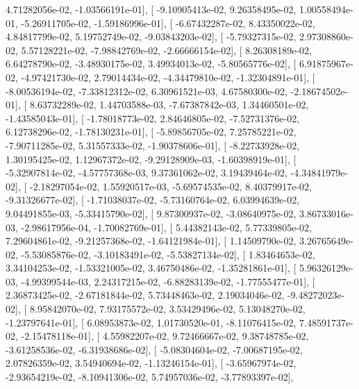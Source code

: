 \documentclass{article}
\begin{document}
          4.71282056e-02,  -1.03566191e-01],
       [ -9.10905413e-02,   9.26358495e-02,   1.00558494e-01,
         -5.26911705e-02,  -1.59186996e-01],
       [ -6.67432287e-02,   8.43350022e-02,   4.84817799e-02,
          5.19752749e-02,  -9.03843203e-02],
       [ -5.79327315e-02,   2.97308860e-02,   5.57128221e-02,
         -7.98842769e-02,  -2.66666154e-02],
       [  8.26308189e-02,   6.64278790e-02,  -3.48930175e-02,
          3.49934013e-02,  -5.80565776e-02],
       [  6.91875967e-02,  -4.97421730e-02,   2.79014434e-02,
         -4.34479810e-02,  -1.32304891e-01],
       [ -8.00536194e-02,  -7.33812312e-02,   6.30961521e-03,
          4.67580300e-02,  -2.18674502e-01],
       [  8.63732289e-02,   1.44703588e-03,  -7.67387842e-03,
          1.34460501e-02,  -1.43585043e-01],
       [ -1.78018773e-02,   2.84646805e-02,  -7.52731376e-02,
          6.12738296e-02,  -1.78130231e-01],
       [ -5.89856705e-02,   7.25785221e-02,  -7.90711285e-02,
          5.31557333e-02,  -1.90378606e-01],
       [ -8.22733928e-02,   1.30195425e-02,   1.12967372e-02,
         -9.29128909e-03,  -1.60398919e-01],
       [ -5.32907814e-02,  -4.57757368e-03,   9.37361062e-02,
          3.19439464e-02,  -4.34841979e-02],
       [ -2.18297054e-02,   1.55920517e-03,  -5.69574535e-02,
          8.40379917e-02,  -9.31326677e-02],
       [ -1.71038037e-02,  -5.73160764e-02,   6.03994639e-02,
          9.04491855e-03,  -5.33415790e-02],
       [  9.87300937e-02,  -3.08640975e-02,   3.86733016e-03,
         -2.98617956e-04,  -1.70082769e-01],
       [  5.44382143e-02,   5.77339805e-02,   7.29604861e-02,
         -9.21257368e-02,  -1.64121984e-01],
       [  1.14509790e-02,   3.26765649e-02,  -5.53085876e-02,
         -3.10183491e-02,  -5.53827134e-02],
       [  1.83464653e-02,   3.34104253e-02,  -1.53321005e-02,
          3.46750486e-02,  -1.35281861e-01],
       [  5.96326129e-03,  -4.99399544e-03,   2.24317215e-02,
         -6.88283139e-02,  -1.77555477e-01],
       [  2.36873425e-02,  -2.67181844e-02,   5.73448463e-02,
          2.19034046e-02,  -9.48272023e-02],
       [  8.95842070e-02,   7.93175572e-02,   3.53429496e-02,
          5.13048270e-02,  -1.23797641e-01],
       [  6.08953873e-02,   1.01730520e-01,  -8.11076415e-02,
          7.48591737e-02,  -2.15478118e-01],
       [  4.55982207e-02,   9.72466667e-02,   9.38748785e-02,
         -3.61258536e-02,  -6.31938686e-02],
       [ -5.08304604e-02,  -7.00687195e-02,   2.07826359e-02,
          3.54940694e-02,  -1.13246154e-01],
       [ -3.65967974e-02,  -2.93654219e-02,  -8.10941306e-02,
          5.74957036e-02,  -3.77893397e-02],
\end{document}
